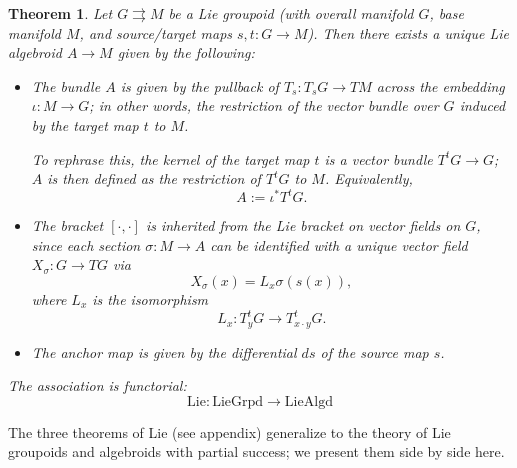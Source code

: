 \documentclass{tufte-handout}
\newtheorem{thrm}{Theorem}
\begin{document}
\begin{thrm} %
Let $G \rightrightarrows M$ be a Lie groupoid (with overall manifold $G$, base manifold $M$, and source/target maps $s,t: G \to M$). Then there exists a unique Lie algebroid $A \to M$ given by the following:
\begin{itemize}
\item The bundle $A$ is given by the pullback of $T_s : T_s G \to TM$ across the embedding $\iota: M \to G$; in other words, the restriction of the vector bundle over $G$ induced by the target map $t$ to $M$.

To rephrase this, the kernel of the target map $t$ is a vector bundle $T^t G \to G$; $A$ is then defined as the restriction of $T^t G$ to $M$. Equivalently,
$$
A := \iota^* T^t G.
$$

\item The bracket $[\cdot,\cdot]$ is inherited from the Lie bracket on vector fields on $G$, since each section $\sigma: M \to A$ can be identified with a unique vector field $X_\sigma: G \to TG$ via
$$
X_\sigma (x) = L_x \sigma(s(x)),
$$
where $L_x$ is the isomorphism
$$
L_x : T^t_y G \to T^t_{x \cdot y} G.
$$

\item The anchor map is given by the differential $ds$ of the source map $s$.
\end{itemize}

The association is functorial:
$$ %
\mathrm{Lie} : \mathrm{LieGrpd} \to \mathrm{LieAlgd}
$$

\end{thrm}

The three theorems of Lie (see appendix) generalize to the theory of Lie groupoids and algebroids with partial success; we present them side by side here.
\end{document}
